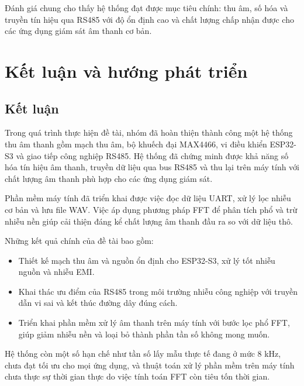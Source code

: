 \documentclass[a4paper]{report}
\begin{document}
Đánh giá chung cho thấy hệ thống đạt được mục tiêu chính: thu âm, số hóa và truyền tín hiệu qua RS485 với độ ổn định cao và chất lượng chấp nhận được cho các ứng dụng giám sát âm thanh cơ bản. 


\chapter{Kết luận và hướng phát triển}
\section{Kết luận}
Trong quá trình thực hiện đề tài, nhóm đã hoàn thiện thành công một hệ thống thu âm thanh gồm mạch thu âm, bộ khuếch đại MAX4466, vi điều khiển ESP32-S3 và giao tiếp công nghiệp RS485. Hệ thống đã chứng minh được khả năng số hóa tín hiệu âm thanh, truyền dữ liệu qua bus RS485 và thu lại trên máy tính với chất lượng âm thanh phù hợp cho các ứng dụng giám sát.

Phần mềm máy tính đã triển khai được việc đọc dữ liệu UART, xử lý lọc nhiễu cơ bản và lưu file WAV. Việc áp dụng phương pháp FFT để phân tích phổ và trừ nhiễu nền giúp cải thiện đáng kể chất lượng âm thanh đầu ra so với dữ liệu thô.

Những kết quả chính của đề tài bao gồm:
\begin{itemize}
    \item Thiết kế mạch thu âm và nguồn ổn định cho ESP32-S3, xử lý tốt nhiễu nguồn và nhiễu EMI.
    \item Khai thác ưu điểm của RS485 trong môi trường nhiễu công nghiệp với truyền dẫn vi sai và kết thúc đường dây đúng cách.
    \item Triển khai phần mềm xử lý âm thanh trên máy tính với bước lọc phổ FFT, giúp giảm nhiễu nền và loại bỏ thành phần tần số không mong muốn.
\end{itemize}

Hệ thống còn một số hạn chế như tần số lấy mẫu thực tế đang ở mức 8 kHz, chưa đạt tối ưu cho mọi ứng dụng, và thuật toán xử lý phần mềm trên máy tính chưa thực sự thời gian thực do việc tính toán FFT còn tiêu tốn thời gian.
\end{document}
